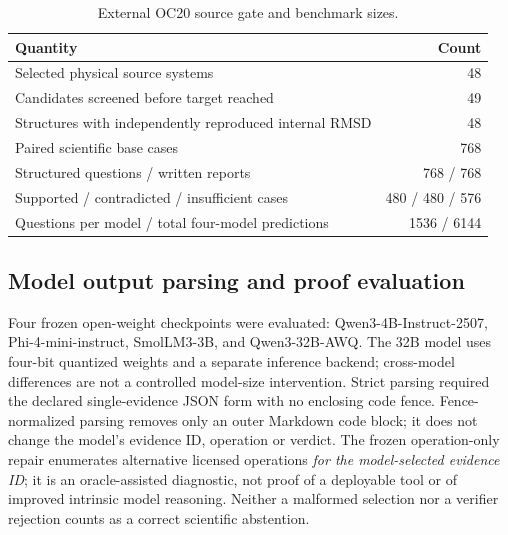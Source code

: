 \documentclass[11pt]{article}
\begin{document}
\begin{table}[htbp]\centering\small
\caption{External OC20 source gate and benchmark sizes.}
\begin{tabular}{lr}\toprule Quantity&Count\\\midrule
Selected physical source systems&48\\
Candidates screened before target reached&49\\
Structures with independently reproduced internal RMSD&48\\
Paired scientific base cases&768\\
Structured questions / written reports&768 / 768\\
Supported / contradicted / insufficient cases&480 / 480 / 576\\
Questions per model / total four-model predictions&1536 / 6144\\
\bottomrule\end{tabular}
\end{table}

\subsection{Model output parsing and proof evaluation}
Four frozen open-weight checkpoints were evaluated: Qwen3-4B-Instruct-2507, Phi-4-mini-instruct, SmolLM3-3B, and Qwen3-32B-AWQ. The 32B model uses four-bit quantized weights and a separate inference backend; cross-model differences are not a controlled model-size intervention. Strict parsing required the declared single-evidence JSON form with no enclosing code fence. Fence-normalized parsing removes only an outer Markdown code block; it does not change the model's evidence ID, operation or verdict. The frozen operation-only repair enumerates alternative licensed operations \emph{for the model-selected evidence ID}; it is an oracle-assisted diagnostic, not proof of a deployable tool or of improved intrinsic model reasoning. Neither a malformed selection nor a verifier rejection counts as a correct scientific abstention.
\end{document}
